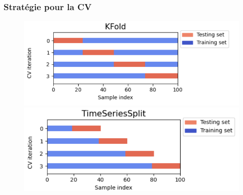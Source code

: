 \documentclass{beamer}
\begin{document}
\begin{frame}
	\frametitle{Stratégie pour la CV}
		\begin{figure}[h]
			\centering
			\includegraphics[scale=0.4]{kfold}
			\includegraphics[scale=0.4]{tscv}
		\end{figure}
\end{frame}
\end{document}
